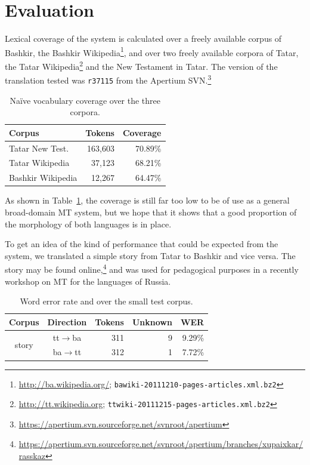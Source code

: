 \documentclass[11pt,a4paper]{article}
\begin{document}
\section{Evaluation}
\label{sec:eval}

Lexical coverage of the system is calculated over a freely available corpus of Bashkir, the Bashkir
Wikipedia\footnote{\url{http://ba.wikipedia.org/}; {\tt bawiki-20111210-pages-articles.xml.bz2}}, and over two freely available corpora of 
Tatar, the Tatar Wikipedia\footnote{\url{http://tt.wikipedia.org}; {\tt ttwiki-20111215-pages-articles.xml.bz2}} and the New Testament in Tatar. The version of the translation tested was {\tt {\small r37115}} from the Apertium SVN.\footnote{\url{https://apertium.svn.sourceforge.net/svnroot/apertium}}

\begin{table}
  \begin{center}
  \begin{tabular}{l|r|r}
   Corpus                  & Tokens    & Coverage\\
   \hline
   Tatar New Test.         & 163,603   & 70.89\% \\
   Tatar Wikipedia         & 37,123    & 68.21\% \\
   \hline
   Bashkir Wikipedia       & 12,267    & 64.47\% \\
   \hline
  \end{tabular}
    \caption{Na\"ive vocabulary coverage over the three corpora.}
    \label{table:coverage}
  \end{center}
\end{table}

As shown in Table~\ref{table:coverage}, the coverage is still far too low to be of use as a 
general broad-domain MT system, but we hope that it shows that a good proportion of 
the morphology of both languages is in place.

To get an idea of the kind of performance that could be expected from the system, we 
translated a simple story from Tatar to Bashkir and vice versa. The story may be found 
online,\footnote{\url{https://apertium.svn.sourceforge.net/svnroot/apertium/branches/xupaixkar/rasskaz}}
and was used for pedagogical purposes in a recently workshop on MT
for the languages of Russia.

\begin{table}
  \begin{center}
  \begin{tabular}{c|c|r|r|r}
   Corpus                 & Direction         & Tokens  & Unknown & WER  \\
  \hline
   \multirow{2}{*}{story} & tt$\rightarrow$ba & 311     & 9  & 9.29\% \\
                          & ba$\rightarrow$tt & 312     & 1  & 7.72\%  \\
  \hline
  \end{tabular}
    \caption{Word error rate and over the small test corpus.}
    \label{table:wer}
  \end{center}
\end{table}
\end{document}

